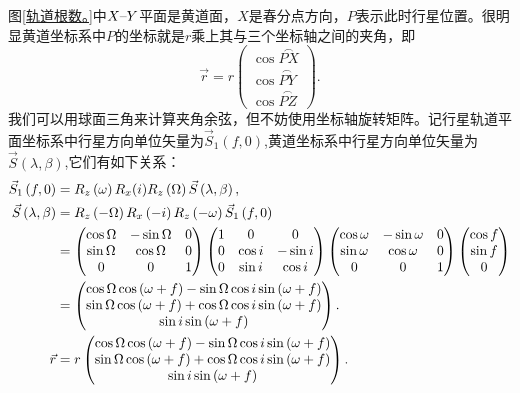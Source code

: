 \documentclass[11pt, a4paper, oneside]{ctexart}
\numberwithin{equation}{subsection}
\begin{document}
图\ref{轨道根数。}中$X\text{\textendash}Y$平面是黄道面，$X$是春分点方向，$P$表示此时行星位置。很明显黄道坐标系中$P$的坐标就是$r$乘上其与三个坐标轴之间的夹角，即
\begin{equation}
\vec{r}=r\begin{pmatrix}
\cos\overset{\frown}{PX}\\
\cos\overset{\frown}{PY}\\
\cos\overset{\frown}{PZ}
\end{pmatrix}.
\end{equation}
我们可以用球面三角来计算夹角余弦，但不妨使用坐标轴旋转矩阵。记行星轨道平面坐标系中行星方向单位矢量为$\vec{S}_{1}\left(f,0\right)$,黄道坐标系中行星方向单位矢量为$\vec{S}\left(\lambda,\beta\right)$,它们有如下关系：
\begin{align}
\vec{S}_{1}\left(f,0\right)&=R_{z}\left(\omega\right)R_{x}(i)R_{z}\left(\Omega\right)\vec{S}\left(\lambda,\beta\right),\\
\vec{S}\left(\lambda,\beta\right)&=R_{z}\left(-\Omega\right)R_{x}\left(-i\right)R_{z}\left(-\omega\right)\vec{S}_{1}\left(f,0\right)\notag\\
&=\begin{pmatrix}
\cos\Omega & -\sin\Omega & 0\\
\sin\Omega & \cos\Omega & 0\\
0 & 0 & 1
\end{pmatrix}
\begin{pmatrix}
1 & 0 & 0\\
0 & \cos i & -\sin i\\
0 & \sin i & \cos i
\end{pmatrix}
\begin{pmatrix}
\cos\omega & -\sin\omega & 0\\
\sin\omega & \cos\omega & 0\\
0 & 0 & 1
\end{pmatrix}
\begin{pmatrix}
\cos f\\
\sin f\\
0
\end{pmatrix}\notag\\
&=\begin{pmatrix}
\cos\Omega\cos\left(\omega+f\right)-\sin\Omega\cos i\sin\left(\omega+f\right)\\
\sin\Omega\cos\left(\omega+f\right)+\cos\Omega\cos i\sin\left(\omega+f\right)\\
\sin i\sin\left(\omega+f\right)
\end{pmatrix}.\\
\vec{r}&=r\begin{pmatrix}
\cos\Omega\cos\left(\omega+f\right)-\sin\Omega\cos i\sin\left(\omega+f\right)\\
\sin\Omega\cos\left(\omega+f\right)+\cos\Omega\cos i\sin\left(\omega+f\right)\\
\sin i\sin\left(\omega+f\right)
\end{pmatrix}.\label{4.0.11}
\end{align}
\end{document}
